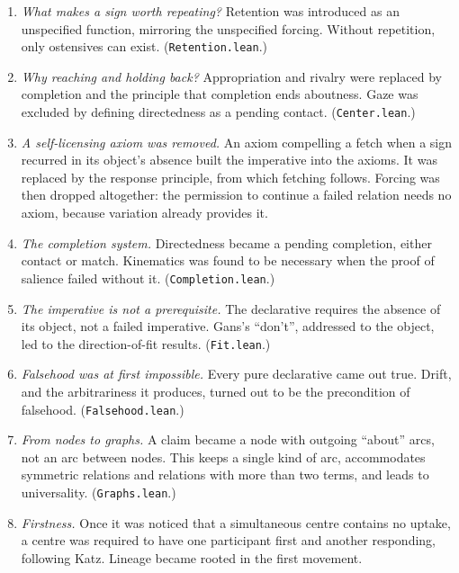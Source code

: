\documentclass[11pt]{article}
\begin{document}
\begin{enumerate}
    mutual restraint is unstable. A division of the object afterwards (the sparagmos) was
    considered as the payoff and rejected as an unnecessary narrative commitment. Chance,
    meaning that any movement may occur, was adopted instead: a joint holding-back can
    simply happen.
  \item \emph{What makes a sign worth repeating?} Retention was introduced as an
    unspecified function, mirroring the unspecified forcing. Without repetition, only
    ostensives can exist. (\texttt{Retention.lean}.)
  \item \emph{Why reaching and holding back?} Appropriation and rivalry were replaced by
    completion and the principle that completion ends aboutness. Gaze was excluded by
    defining directedness as a pending contact. (\texttt{Center.lean}.)
  \item \emph{A self-licensing axiom was removed.} An axiom compelling a fetch when a sign
    recurred in its object's absence built the imperative into the axioms. It was replaced
    by the response principle, from which fetching follows. Forcing was then dropped
    altogether: the permission to continue a failed relation needs no axiom, because
    variation already provides it.
  \item \emph{The completion system.} Directedness became a pending completion, either
    contact or match. Kinematics was found to be necessary when the proof of salience
    failed without it. (\texttt{Completion.lean}.)
  \item \emph{The imperative is not a prerequisite.} The declarative requires the absence of
    its object, not a failed imperative. Gans's ``don't'', addressed to the object, led to
    the direction-of-fit results. (\texttt{Fit.lean}.)
  \item \emph{Falsehood was at first impossible.} Every pure declarative came out true.
    Drift, and the arbitrariness it produces, turned out to be the precondition of
    falsehood. (\texttt{Falsehood.lean}.)
  \item \emph{From nodes to graphs.} A claim became a node with outgoing ``about'' arcs, not
    an arc between nodes. This keeps a single kind of arc, accommodates symmetric relations
    and relations with more than two terms, and leads to universality.
    (\texttt{Graphs.lean}.)
  \item \emph{Firstness.} Once it was noticed that a simultaneous centre contains no
    uptake, a centre was required to have one participant first and another responding,
    following Katz. Lineage became rooted in the first movement.

\end{enumerate}
\end{document}
